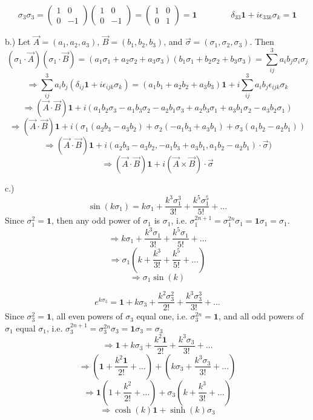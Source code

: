 \documentclass[12pt]{article}
\begin{document}
$$\sigma_3 \sigma_3 = \begin{pmatrix} 1 & 0 \\ 0 & -1 \end{pmatrix} \begin{pmatrix} 1 & 0 \\ 0 & -1 \end{pmatrix} = \begin{pmatrix} 1 & 0 \\ 0 & 1 \end{pmatrix} = \textbf{1} \qquad \qquad \delta_{33}\textbf{1} + i \epsilon_{33k} \sigma_k = \textbf{1}$$

b.) Let $\vec{A} = (a_1, a_2, a_3)$, $\vec{B} = (b_1, b_2, b_3)$, and $\vec{\sigma} = (\sigma_1, \sigma_2, \sigma_3)$. Then
$$(\sigma_1 \cdot \vec{A})(\sigma_1 \cdot \vec{B}) =  (a_1 \sigma_1 + a_2 \sigma_2 + a_3 \sigma_3)(b_1 \sigma_1 + b_2 \sigma_2 + b_3 \sigma_3) = \sum_{ij}^3 a_{i} b_{j} \sigma_i \sigma_j$$
$$\Rightarrow \sum_{ij}^3 a_i b_j (\delta_{ij} \textbf{1} +  i \epsilon_{ijk} \sigma_k) = (a_1 b_1 + a_2 b_2 + a_3 b_3) \textbf{1} + i \sum_{ij}^3 a_i b_j \epsilon_{ijk} \sigma_k$$
$$\Rightarrow (\vec{A} \cdot \vec{B}) \textbf{1} + i(a_1 b_2 \sigma_3 - a_1 b_3 \sigma_2 - a_2 b_1 \sigma_3 + a_2 b_3 \sigma_1 + a_3 b_1 \sigma_2 - a_3 b_2 \sigma_1)$$
$$\Rightarrow (\vec{A} \cdot \vec{B}) \textbf{1} + i(\sigma_1(a_2 b_3 - a_3 b_2) + \sigma_2(-a_1 b_3 + a_3 b_1) + \sigma_3(a_1 b_2 - a_2 b_1))$$
$$\Rightarrow (\vec{A} \cdot \vec{B}) \textbf{1} + i(a_2 b_3 - a_3 b_2, -a_1 b_3 + a_3 b_1, a_1 b_2 - a_2 b_1) \cdot \vec{\sigma})$$
$$\Rightarrow (\vec{A} \cdot \vec{B}) \textbf{1} + i(\vec{A} \times \vec{B}) \cdot \vec{\sigma}$$

c.)$$\sin(k \sigma_1) = k \sigma_1 + \frac{k^3 \sigma_1^3}{3!} + \frac{k^5 \sigma_1^5}{5!} + \dots$$
Since $\sigma_1^2 = \textbf{1}$, then any odd power of $\sigma_1$ is $\sigma_1$, i.e. $\sigma_1^{2n + 1} = \sigma_1^{2n} \sigma_1 = \textbf{1} \sigma_1 = \sigma_1$.
$$\Rightarrow k \sigma_1 + \frac{k^3 \sigma_1}{3!} + \frac{k^5 \sigma_1}{5!} + \dots$$
$$\Rightarrow \sigma_1 (k + \frac{k^3}{3!} + \frac{k^5}{5!} + \dots)$$
$$\Rightarrow \sigma_1 \sin(k)$$

$$e^{k \sigma_3} = \textbf{1} + k \sigma_3 + \frac{k^2 \sigma_3^2}{2!} + \frac{k^3 \sigma_3^3}{3!} + \dots$$
Since $\sigma_3^2 = \textbf{1}$, all even powers of $\sigma_3$ equal one, i.e. $\sigma_3^{2n} = \textbf{1}$, and all odd powers of $\sigma_1$  equal $\sigma_1$, i.e. $\sigma_3^{2n + 1} = \sigma_3^{2n} \sigma_3 = \textbf{1} \sigma_3 = \sigma_3$ 
$$\Rightarrow \textbf{1} + k \sigma_3 + \frac{k^2 \textbf{1}}{2!} + \frac{k^3 \sigma_3}{3!} + \dots$$
$$\Rightarrow (\textbf{1} + \frac{k^2 \textbf{1}}{2!} + \dots) + (k \sigma_3 + \frac{k^3 \sigma_3}{3!} + \dots)$$
$$\Rightarrow \textbf{1}(1 + \frac{k^2}{2!} + \dots) + \sigma_3(k + \frac{k^3}{3!} + \dots)$$
$$\Rightarrow \cosh(k) \textbf{1} + \sinh(k) \sigma_3$$
\end{document}

